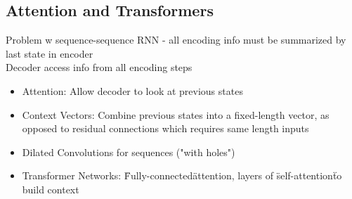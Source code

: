 \subsection*{Attention and Transformers}
Problem w sequence-sequence RNN - all encoding info must be summarized by last state in encoder\\
Decoder access info from all encoding steps
\begin{itemize}
    \item Attention: Allow decoder to look at previous states
    \item Context Vectors: Combine previous states into a fixed-length vector, 
    as opposed to residual connections which requires same length inputs
    \item Dilated Convolutions for sequences ("with holes")
    \item Transformer Networks: \"Fully-connected\" attention, layers of \"self-attention\" to build context  
\end{itemize}
